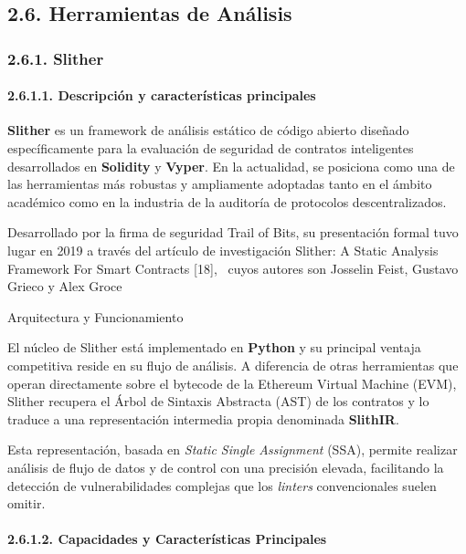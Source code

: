 \subsection{2.6. Herramientas de
Análisis}\label{herramientas-de-anuxe1lisis}

\subsubsection{2.6.1. Slither}\label{slither}

\paragraph{2.6.1.1. Descripción y características
principales}\label{descripciuxf3n-y-caracteruxedsticas-principales}

\textbf{Slither} es un framework de análisis estático de código abierto
diseñado específicamente para la evaluación de seguridad de contratos
inteligentes desarrollados en \textbf{Solidity} y \textbf{Vyper}. En la
actualidad, se posiciona como una de las herramientas más robustas y
ampliamente adoptadas tanto en el ámbito académico como en la industria
de la auditoría de protocolos descentralizados.

Desarrollado por la firma de seguridad Trail of Bits, su presentación
formal tuvo lugar en 2019 a través del artículo de investigación
Slither: A Static Analysis Framework For Smart Contracts {[}18{]},~
cuyos autores son Josselin Feist, Gustavo Grieco y Alex Groce

Arquitectura y Funcionamiento

El núcleo de Slither está implementado en \textbf{Python} y su principal
ventaja competitiva reside en su flujo de análisis. A diferencia de
otras herramientas que operan directamente sobre el bytecode de la
Ethereum Virtual Machine (EVM), Slither recupera el Árbol de Sintaxis
Abstracta (AST) de los contratos y lo traduce a una representación
intermedia propia denominada \textbf{SlithIR}.

Esta representación, basada en \emph{Static Single Assignment} (SSA),
permite realizar análisis de flujo de datos y de control con una
precisión elevada, facilitando la detección de vulnerabilidades
complejas que los \emph{linters} convencionales suelen omitir.

\paragraph{2.6.1.2. Capacidades y Características
Principales}\label{capacidades-y-caracteruxedsticas-principales}

